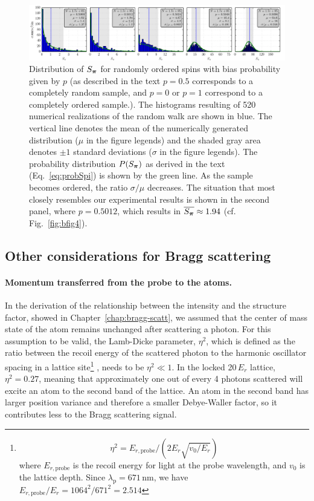 \begin{figure}
\centering
\includegraphics[width=\textwidth]{../figures/braggscatt/Noise_hist.png}
\caption[Fluctuations in $S_{\bv{\pi}}$]{\small Distribution of $S_{\bv{\pi}}$
for randomly ordered spins with bias probability given by $p$ (as described in
the text $p=0.5$ corresponds to a completely random sample, and $p=0$ or $p=1$
correspond to a completely ordered sample.).   The histograms resulting of 520
numerical realizations of the random walk are shown in blue.  The vertical line
denotes the mean of the numerically generated distribution ($\mu$ in the figure
legends) and the shaded gray area denotes $\pm1$ standard deviations ($\sigma$
in the figure legends). The probability distribution $P(S_{\bm{\pi}})$ as
derived in the text (Eq.~\ref{eq:probSpi}) is shown by the green line.  As the
sample becomes ordered, the ratio $\sigma/\mu$ decreases.  The situation that
most closely resembles our experimental results is shown in the second panel,
where $p=0.5012$, which results in $\overline{S_{\bm{\pi}}}\approx 1.94$ (cf.
Fig.~\ref{fig:bfig4}).}
\label{fig:spi-noise}
\end{figure}

\subsection{Other considerations for Bragg scattering} 

\paragraph{Momentum transferred from the probe to the atoms.}

In the derivation of the relationship between the intensity and the structure
factor, showed in Chapter~\ref{chap:bragg-scatt}, we assumed that the center of
mass state of the atom remains unchanged after scattering a photon.  For this
assumption to be valid, the Lamb-Dicke  parameter, $\eta^{2}$, which is defined
as the ratio between the recoil energy of the scattered photon to the harmonic
oscillator spacing in a lattice site\footnote{  \begin{equation} \eta^{2}=
E_{r,\text{probe}} /( 2E_{r} \sqrt{v_{0}/E_{r}})\end{equation} where
$E_{r,\text{probe}}$ is the recoil energy for light at the probe wavelength,
and $v_{0}$ is the lattice depth. Since
$\lambda_{\mathrm{p}}=671\,\mathrm{nm}$, we have $E_{r,\text{probe}} /E_{r} =
1064^{2}/671^{2}=2.514$ } , needs to be $\eta^{2} \ll 1$.  In the locked
20\,$E_{r}$ lattice, $\eta^{2}= 0.27$, meaning that approximately one out of
every 4 photons scattered will excite an atom to the second band of the
lattice.    An atom in the second band has larger position variance and
therefore a smaller Debye-Waller factor,  so it contributes less to the Bragg
scattering signal.

